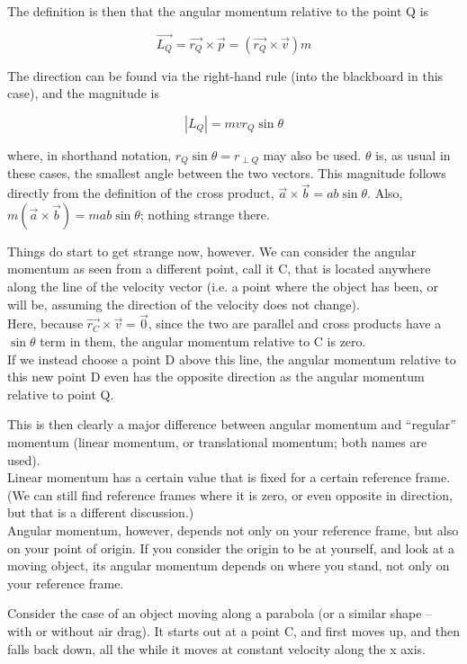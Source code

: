 \documentclass[12pt,a4paper]{report}
\begin{document}
The definition is then that the angular momentum relative to the point Q is

\begin{equation}
\vec{L_Q} = \vec{r_Q} \times \vec{p} = (\vec{r_Q} \times \vec{v}) m
\end{equation}

The direction can be found via the right-hand rule (into the blackboard in this case), and the magnitude is

\begin{equation}
|L_Q| = m v r_Q \sin \theta
\end{equation}

where, in shorthand notation, $r_Q \sin \theta = r_{\perp Q}$ may also be used. $\theta$ is, as usual in these cases, the smallest angle between the two vectors. This magnitude follows directly from the definition of the cross product, $\vec{a} \times \vec{b} = a b \sin \theta$. Also, $m(\vec{a} \times \vec{b}) = m a b \sin \theta$; nothing strange there.

Things do start to get strange now, however. We can consider the angular momentum as seen from a different point, call it C, that is located anywhere along the line of the velocity vector (i.e. a point where the object has been, or will be, assuming the direction of the velocity does not change).\\
Here, because $\vec{r_{C}} \times \vec{v} = \vec{0}$, since the two are parallel and cross products have a $\sin \theta$ term in them, the angular momentum relative to C is zero.\\
If we instead choose a point D above this line, the angular momentum relative to this new point D even has the opposite direction as the angular momentum relative to point Q.

This is then clearly a major difference between angular momentum and ``regular'' momentum (linear momentum, or translational momentum; both names are used).\\
Linear momentum has a certain value that is fixed for a certain reference frame. (We can still find reference frames where it is zero, or even opposite in direction, but that is a different discussion.)\\
Angular momentum, however, depends not only on your reference frame, but also on your point of origin. If you consider the origin to be at yourself, and look at a moving object, its angular momentum depends on where you stand, not only on your reference frame.

Consider the case of an object moving along a parabola (or a similar shape -- with or without air drag). It starts out at a point C, and first moves up, and then falls back down, all the while it moves at constant velocity along the x axis.
\end{document}
